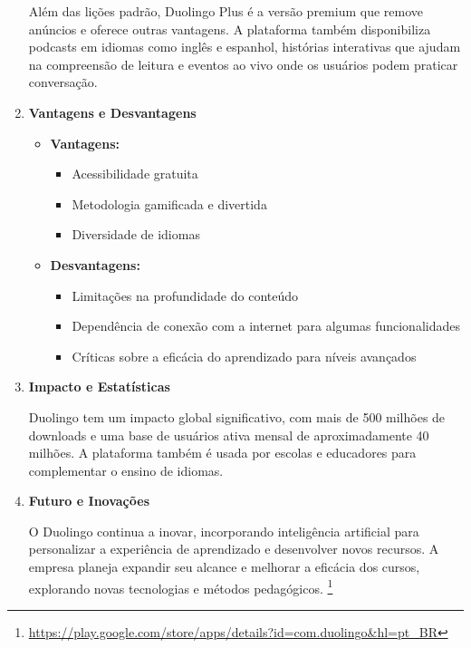 \begin{enumerate}
    Além das lições padrão, Duolingo Plus é a versão premium que remove anúncios e oferece outras vantagens. A plataforma também disponibiliza podcasts em idiomas como inglês e espanhol, histórias interativas que ajudam na compreensão de leitura e eventos ao vivo onde os usuários podem praticar conversação.

    \item \textbf{Vantagens e Desvantagens}
    
    \begin{itemize}
        \item \textbf{Vantagens:}
        \begin{itemize}
            \item Acessibilidade gratuita
            \item Metodologia gamificada e divertida
            \item Diversidade de idiomas
        \end{itemize}

        \item \textbf{Desvantagens:}
        \begin{itemize}
            \item Limitações na profundidade do conteúdo
            \item Dependência de conexão com a internet para algumas funcionalidades
            \item Críticas sobre a eficácia do aprendizado para níveis avançados
        \end{itemize}
    \end{itemize}

    \item \textbf{Impacto e Estatísticas}
    
    Duolingo tem um impacto global significativo, com mais de 500 milhões de downloads e uma base de usuários ativa mensal de aproximadamente 40 milhões. A plataforma também é usada por escolas e educadores para complementar o ensino de idiomas.

    \item \textbf{Futuro e Inovações}
    
    O Duolingo continua a inovar, incorporando inteligência artificial para personalizar a experiência de aprendizado e desenvolver novos recursos. A empresa planeja expandir seu alcance e melhorar a eficácia dos cursos, explorando novas tecnologias e métodos pedagógicos.
    \footnote{\url{https://play.google.com/store/apps/details?id=com.duolingo&hl=pt_BR}}
\end{enumerate}
   


